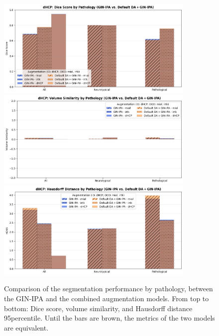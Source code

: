 \begin{figure}[htbp]
  \centering
  \includegraphics[width=0.85\textwidth]{figures/2_pathology_DC.png} \\
  \vspace{10pt}
  \includegraphics[width=0.85\textwidth]{figures/2_pathology_VS.png} \\
  \vspace{10pt}
  \includegraphics[width=0.85\textwidth]{figures/2_pathology_HD.png}
  \caption{Comparison of the segmentation performance by pathology, between the GIN-IPA and the combined augmentation models. From top to bottom: Dice score, volume similarity, and Hausdorff distance 95\th percentile. Until the bars are brown, the metrics of the two models are equivalent.}
  \label{fig:pathology_summary_2}
\end{figure}
